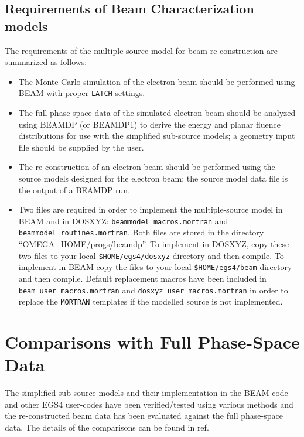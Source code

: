 \documentclass[12pt,twoside]{article}
\begin{document}
\subsection{Requirements of Beam Characterization models}

The requirements of the multiple-source model for beam re-construction are summarized as follows:
\setlength{\parskip}{0ex}
\setlength{\itemsep}{0ex}  %
\setlength{\parindent}{0em}
\begin{itemize}
\item
The Monte Carlo simulation of the electron beam should be performed using
BEAM with proper {\tt LATCH} settings.
\item
The full phase-space data of the simulated electron beam should be
analyzed using BEAMDP (or BEAMDP1) to derive the energy and planar fluence
distributions for use with the simplified sub-source models; a geometry
input file should be supplied by the user.
\item
The re-construction of an electron beam should be performed using the
source models designed for the electron beam; the source model data
file is the output of a BEAMDP run.
\item
Two files are required in order to implement the multiple-source model in
BEAM and in DOSXYZ: {\tt beammodel\_macros.mortran} and {\tt
beammodel\_routines.mortran}. Both files are stored in the directory
``OMEGA\_HOME/progs/beamdp''. To implement in DOSXYZ, copy these two files
to your local {\tt \$HOME/egs4/dosxyz} directory and then compile. To implement in
BEAM copy the files to your local {\tt \$HOME/egs4/beam} directory and then
compile. Default replacement macros have been included in \\
{\tt beam\_user\_macros.mortran} and {\tt dosxyz\_user\_macros.mortran} in
order to replace the {\tt MORTRAN} templates if the modelled source is not
implemented.

\end{itemize}
\setlength{\parindent}{1.5em}
\setlength{\parskip}{0.1in}

\section{Comparisons with Full Phase-Space Data}
 The simplified sub-source models and their implementation in the BEAM code and other EGS4 user-codes have been verified/tested using various methods and the re-constructed beam data has been evaluated against the full phase-space data.
The details of the comparisons can be found in  ref\cite{Ma96}.
\end{document}
